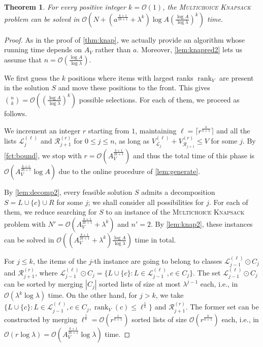 \documentclass{article}
\theoremstyle{plain}
\newtheorem{theorem}{Theorem}[section]
\theoremstyle{definition}
\newcommand{\MK}{\textsc{Multichoice Knapsack}\xspace}
\newcommand{\Oh}{\mathcal{O}}
\renewcommand{\L}{\mathcal{L}}
\newcommand{\R}{\mathcal{R}}
\DeclareMathOperator*{\rank}{rank}
\begin{document}
   
   \begin{theorem}\label{thm:knap3}
    For every positive integer $k=\Oh(1)$, the \MK problem can be solved in $\Oh(N+\allowbreak {(a^{\frac{k+1}{2k+1}}+\lambda^k)}\log A (\frac{\log A}{\log \lambda})^{k})$ time.
  \end{theorem}
  \begin{proof}
  As in the proof of \cref{thm:knap}, we actually provide an algorithm whose running time depends on $A_V$ rather than $a$.
  Moreover, \cref{lem:knapred2} lets us assume that $n=\Oh(\frac{\log A}{\log \lambda})$.   
    
    We first guess the $k$ positions where items with largest ranks $\rank_V$ are present in the solution $S$ and move these positions to the front. This gives $\binom{n}{k}=\Oh((\frac{\log A}{\log \lambda})^k)$ possible selections. For each of them, we proceed as follows.
    
    
    We increment an integer $r$ starting from $1$, maintaining $\ell=\big\lceil r^{\frac{k}{k+1}}\big\rceil$ and all the lists $\L_{j}^{(\ell)}$ and $\R_{j+1}^{(r)}$ for $0\le j \le n$,
    as long as $V^{(\ell)}_{\L_j}+V^{(r)}_{\R_{j+1}}\le V$ for some $j$.
    By \cref{fct:bound}, we stop with $r=\Oh(A_V^{\frac{k+1}{2k+1}})$ and
    thus the total time of this phase is $\Oh(A_V^{\frac{k+1}{2k+1}}\log A)$ due to the online procedure of \cref{lem:generate}.
    
    
    By \cref{lem:decomp2}, every feasible solution $S$  admits a decomposition $S=L\cup\{c\}\cup R$ for some $j$;
    we shall consider all possibilities for $j$.
    For each of them, we reduce searching for $S$ to an instance of the \MK  problem with $N'=\Oh(A_V^{\frac{k+1}{2k+1}}+\lambda^k)$ and $n'=2$. 
    By \cref{lem:knap2}, these instances can be solved in $\Oh((A_V^{\frac{k+1}{2k+1}}+\lambda^k)\frac{\log A}{\log \lambda})$
    time in total.
   
    For $j\le k$, the items of the $j$-th instance are going to belong to classes $\L_{j-1}^{(\ell)}\odot C_j$ and $\R_{j+1}^{(r)}$,
    where $\L_{j-1}^{(\ell)}\odot C_j = \{L\cup \{c\} : L\in \L_{j-1}^{(\ell)} , c\in C_j\}$.
    The set $\L_{j-1}^{(\ell)}\odot C_j$ can be sorted by merging $|C_j|$ sorted lists of size at most $\lambda^{j-1}$ each,
    i.e., in $\Oh(\lambda^k \log \lambda)$ time.
    On the other hand, for $j > k$, we take 
    $\{L\cup \{c\} : L\in \L_{j-1}^{(\ell)} , c\in C_j, \rank_V(c)\le \ell^{\frac{1}{k}}\}$ and $\R_{j+1}^{(r)}$.
    The former set can be constructed by merging $\ell^{\frac{1}{k}}=\Oh(r^\frac{1}{k+1})$ sorted lists of size $\Oh(r^\frac{k}{k+1})$ each,
    i.e., in $\Oh(r\log \lambda)=\Oh(A_V^{\frac{k+1}{2k+1}}\log \lambda)$ time. 
    

\end{proof}
\end{document}

